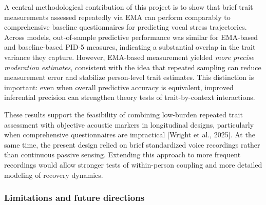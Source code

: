 \documentclass[
  english,
  man]{apa6}
\begin{document}
A central methodological contribution of this project is to show that brief trait measurements assessed repeatedly via EMA can perform comparably to comprehensive baseline questionnaires for predicting vocal stress trajectories. Across models, out-of-sample predictive performance was similar for EMA-based and baseline-based PID-5 measures, indicating a substantial overlap in the trait variance they capture. However, EMA-based measurement yielded \emph{more precise moderation estimates}, consistent with the idea that repeated sampling can reduce measurement error and stabilize person-level trait estimates. This distinction is important: even when overall predictive accuracy is equivalent, improved inferential precision can strengthen theory tests of trait-by-context interactions.

These results support the feasibility of combining low-burden repeated trait assessment with objective acoustic markers in longitudinal designs, particularly when comprehensive questionnaires are impractical {[}Wright et al., 2025{]}. At the same time, the present design relied on brief standardized voice recordings rather than continuous passive sensing. Extending this approach to more frequent recordings would allow stronger tests of within-person coupling and more detailed modeling of recovery dynamics.

\subsubsection{Limitations and future directions}\label{limitations-and-future-directions}
\end{document}
